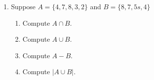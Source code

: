 \documentclass{ximera}
\begin{document}
\begin{enumerate}
\begin{enumerate}
\begin{enumerate}
    \end{enumerate}
    \item Suppose $A=\{4,7,8,3,2\}$ and $B=\{8,7,5s,4\}$
        \begin{enumerate}
            \item Compute $A\cap B$.
            \item Compute $A\cup B$.
            \item Compute $A-B$.
            \item Compute $|A\cup B|$.
        \end{enumerate}
    \end{enumerate}
\end{enumerate}
\end{document}
